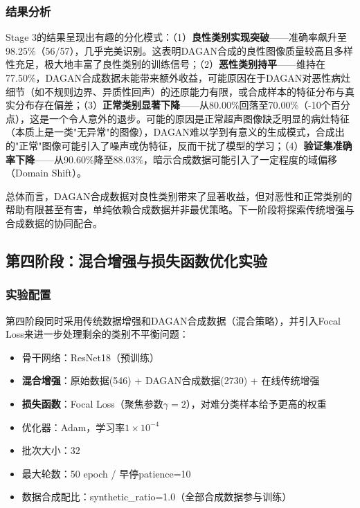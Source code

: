 \subsubsection{结果分析}

Stage 3的结果呈现出有趣的分化模式：（1）\textbf{良性类别实现突破}——准确率飙升至98.25\%（56/57），几乎完美识别。这表明DAGAN合成的良性图像质量较高且多样性充足，极大地丰富了良性类别的训练信号；（2）\textbf{恶性类别持平}——维持在77.50\%，DAGAN合成数据未能带来额外收益，可能原因在于DAGAN对恶性病灶细节（如不规则边界、异质性回声）的还原能力有限，或合成样本的特征分布与真实分布存在偏差；（3）\textbf{正常类别显著下降}——从80.00\%回落至70.00\%（-10个百分点），这是一个令人意外的退步。可能的原因是正常超声图像缺乏明显的病灶特征（本质上是一类"无异常"的图像），DAGAN难以学到有意义的生成模式，合成出的"正常"图像可能引入了噪声或伪特征，反而干扰了模型的学习；（4）\textbf{验证集准确率下降}——从90.60\%降至88.03\%，暗示合成数据可能引入了一定程度的域偏移（Domain Shift）。

总体而言，DAGAN合成数据对良性类别带来了显著收益，但对恶性和正常类别的帮助有限甚至有害，单纯依赖合成数据并非最优策略。下一阶段将探索传统增强与合成数据的协同配合。


\subsection{第四阶段：混合增强与损失函数优化实验}

\subsubsection{实验配置}

第四阶段同时采用传统数据增强和DAGAN合成数据（混合策略），并引入Focal Loss来进一步处理剩余的类别不平衡问题：

\begin{itemize}
    \item 骨干网络：ResNet18（预训练）
    \item \textbf{混合增强}：原始数据(546) + DAGAN合成数据(2730) + 在线传统增强
    \item \textbf{损失函数}：Focal Loss（聚焦参数$\gamma=2$），对难分类样本给予更高的权重
    \item 优化器：Adam，学习率$1\times10^{-4}$
    \item 批次大小：32
    \item 最大轮数：50 epoch / 早停patience=10
    \item 数据合成配比：synthetic\_ratio=1.0（全部合成数据参与训练）
\end{itemize}

